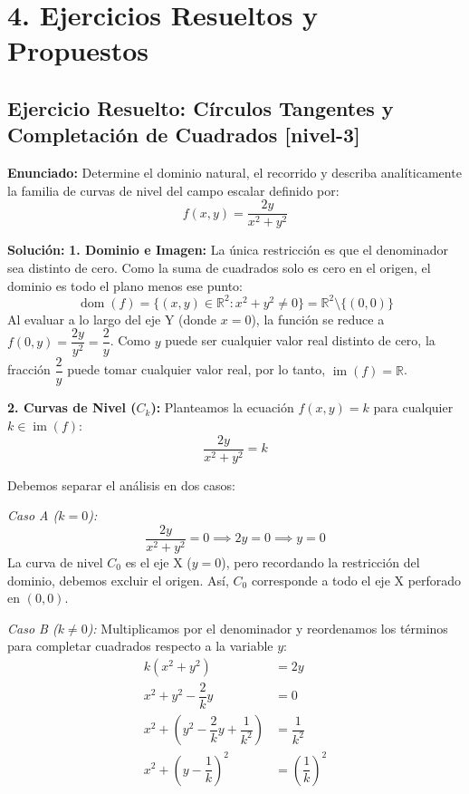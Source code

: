 \documentclass[11pt]{article}
\newenvironment{ejercicios}{%
  \section*{4. Ejercicios Resueltos y Propuestos}%
}{}
\newenvironment{ejercicioresuelto}[2]{\subsection*{Ejercicio Resuelto: #1 \small{[#2]}}}{}
\newcommand{\enunciado}[1]{\textbf{Enunciado:} #1\par\vspace{0.2cm}}
\newcommand{\solucion}[1]{\textbf{Solución:} #1\par\vspace{0.4cm}}
\begin{document}
\begin{ejercicios}

  \begin{ejercicioresuelto}{Círculos Tangentes y Completación de Cuadrados}{nivel-3}
    \enunciado{
      Determine el dominio natural, el recorrido y describa analíticamente la familia de curvas de nivel del campo escalar definido por:
      $$ f(x,y) = \dfrac{2y}{x^2 + y^2} $$
    }
    \solucion{
      \textbf{1. Dominio e Imagen:}
      La única restricción es que el denominador sea distinto de cero. Como la suma de cuadrados solo es cero en el origen, el dominio es todo el plano menos ese punto:
      $$ \operatorname{dom}(f) = \{ (x,y) \in \mathbb{R}^2 \colon x^2 + y^2 \neq 0 \} = \mathbb{R}^2 \setminus \{(0,0)\} $$
      Al evaluar a lo largo del eje Y (donde $x=0$), la función se reduce a $f(0,y) = \dfrac{2y}{y^2} = \dfrac{2}{y}$. Como $y$ puede ser cualquier valor real distinto de cero, la fracción $\dfrac{2}{y}$ puede tomar cualquier valor real, por lo tanto, $\operatorname{im}(f) = \mathbb{R}$.

      \textbf{2. Curvas de Nivel ($C_k$):}
      Planteamos la ecuación $f(x,y) = k$ para cualquier $k \in \operatorname{im}(f)$:
      $$ \dfrac{2y}{x^2 + y^2} = k $$
      
      Debemos separar el análisis en dos casos:
      
      \textit{Caso A ($k = 0$):}
      $$ \dfrac{2y}{x^2 + y^2} = 0 \implies 2y = 0 \implies y = 0 $$
      La curva de nivel $C_0$ es el eje X ($y=0$), pero recordando la restricción del dominio, debemos excluir el origen. Así, $C_0$ corresponde a todo el eje X perforado en $(0,0)$.

      \textit{Caso B ($k \neq 0$):}
      Multiplicamos por el denominador y reordenamos los términos para completar cuadrados respecto a la variable $y$:
      \[
      \begin{aligned}
        k(x^2 + y^2) &= 2y \\
        x^2 + y^2 - \dfrac{2}{k}y &= 0 \\
        x^2 + \left( y^2 - \dfrac{2}{k}y + \dfrac{1}{k^2} \right) &= \dfrac{1}{k^2} \\
        x^2 + \left( y - \dfrac{1}{k} \right)^2 &= \left( \dfrac{1}{k} \right)^2
      \end{aligned}
      \]
      
}
\end{ejercicioresuelto}
\end{ejercicios}
\end{document}
